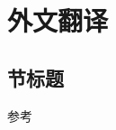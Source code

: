 \cleardoublepage

\newrefsection

\chapter{外文翻译}


\section{节标题}


参考~\cite{zjuthesisrules, zjuthesis}

\begingroup
    \printbibliography[title={外文翻译参考文献}]
\endgroup
